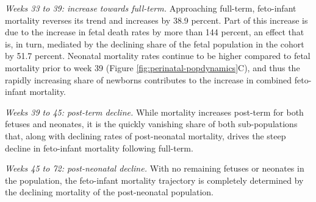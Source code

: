 \documentclass[10pt, twoside]{article}
\begin{document}
\emph{Weeks 33 to 39: increase towards full-term.} Approaching full-term, feto-infant mortality reverses its trend and increases by 38.9 percent. Part of this increase is due to the increase in fetal death rates by more than 144 percent, an effect that is, in turn, mediated by the declining share of the fetal population in the cohort by 51.7 percent. Neonatal mortality rates continue to be higher compared to fetal mortality prior to week 39 (Figure \ref{fig:perinatal-popdynamics}C), and thus the rapidly increasing share of newborns contributes to the increase in combined feto-infant mortality.

\emph{Weeks 39 to 45: post-term decline.} While mortality increases post-term for both fetuses and neonates, it is the quickly vanishing share of both sub-populations that, along with declining rates of post-neonatal mortality, drives the steep decline in feto-infant mortality following full-term.

\emph{Weeks 45 to 72: post-neonatal decline.} With no remaining fetuses or neonates in the population, the feto-infant mortality trajectory is completely determined by the declining mortality of the post-neonatal population.

\vspace{2cm}
\end{document}
